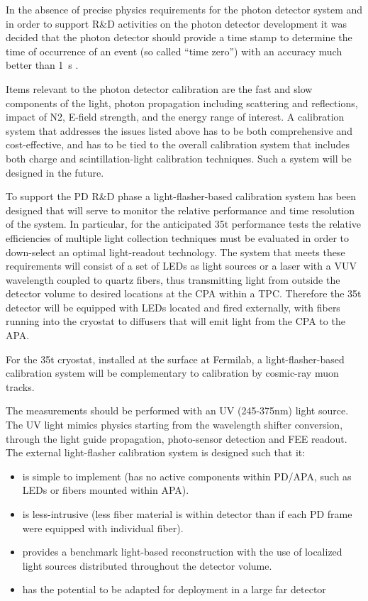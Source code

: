 In the absence of precise physics requirements
for the photon detector system and in order to support R\&D activities
on the photon detector development it was decided that the photon
detector should provide a time stamp to determine the time of
occurrence of an event (so called ``time zero'') with an accuracy much
better than 1~s .  

Items relevant to the photon detector calibration
are the fast and slow components of the light, photon propagation
including scattering and reflections, impact of N2,  E-field strength,
and the energy range of interest. A calibration system that
addresses the issues listed above has to be both comprehensive and
cost-effective, and has to be tied to the overall calibration system
that includes both charge and scintillation-light calibration
techniques. Such a system will be designed in the future.  

To support
the PD R\&D phase a light-flasher-based calibration system
has been designed
that will serve to monitor the relative performance and time
resolution of the system. In particular, for the anticipated 35t
performance tests the relative efficiencies of
multiple light collection techniques must be evaluated in order to 
down-select an optimal light-readout technology. The system that meets
these requirements will consist of a set of LEDs as light sources or a
laser with a VUV wavelength coupled to quartz fibers, thus
transmitting light from outside the detector volume to desired
locations at the CPA within a TPC. Therefore the 35t
detector will be equipped with LEDs located and fired externally, with fibers running
into the cryostat to diffusers that will emit light from the CPA to
the APA. 

For the 35t cryostat, installed at the surface at Fermilab,  a light-flasher-based calibration system will be
complementary to calibration by cosmic-ray muon tracks.

The  measurements should be performed with an UV
(245-375nm) light source. The UV light mimics physics starting from
the wavelength shifter conversion, through the light guide propagation,
photo-sensor detection and FEE readout.  The external light-flasher
calibration system is designed such that it:
\begin{itemize}
\item is simple to implement (has no active components within PD/APA, such as
  LEDs or fibers mounted within APA).
\item is less-intrusive (less fiber material is within detector %
than if each PD frame were equipped with individual fiber).
  \item
  provides a benchmark light-based reconstruction with the use of
  localized light sources distributed throughout the detector volume.
\item has the potential to be adapted for deployment in a large far
  detector%
\end{itemize}

